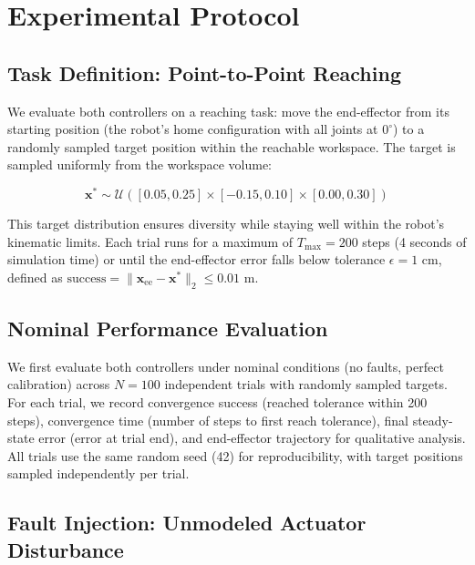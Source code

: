 \documentclass[12pt,a4paper,oneside]{report}
\begin{document}
\section{Experimental Protocol}

\subsection{Task Definition: Point-to-Point Reaching}
\label{subsec:task_definition_point_to_point_reaching}

We evaluate both controllers on a reaching task: move the end-effector from its starting position (the robot's home configuration with all joints at $0^\circ$) to a randomly sampled target position within the reachable workspace. The target is sampled uniformly from the workspace volume:

\begin{equation}
\mathbf{x}^* \sim \mathcal{U}([0.05, 0.25] \times [-0.15, 0.10] \times [0.00, 0.30])
\end{equation}

This target distribution ensures diversity while staying well within the robot's kinematic limits. Each trial runs for a maximum of $T_{\text{max}} = 200$ steps (4 seconds of simulation time) or until the end-effector error falls below tolerance $\epsilon = 1$ cm, defined as $\text{success} = \|\mathbf{x}_{\text{ee}} - \mathbf{x}^*\|_2 \leq 0.01$ m.

\subsection{Nominal Performance Evaluation}
\label{subsec:nominal_performance_evaluation}

We first evaluate both controllers under nominal conditions (no faults, perfect calibration) across $N = 100$ independent trials with randomly sampled targets. For each trial, we record convergence success (reached tolerance within 200 steps), convergence time (number of steps to first reach tolerance), final steady-state error (error at trial end), and end-effector trajectory for qualitative analysis. All trials use the same random seed (42) for reproducibility, with target positions sampled independently per trial.

\subsection{Fault Injection: Unmodeled Actuator Disturbance}
\label{subsec:fault_injection_unmodeled_actuator_disturbance}
\end{document}
